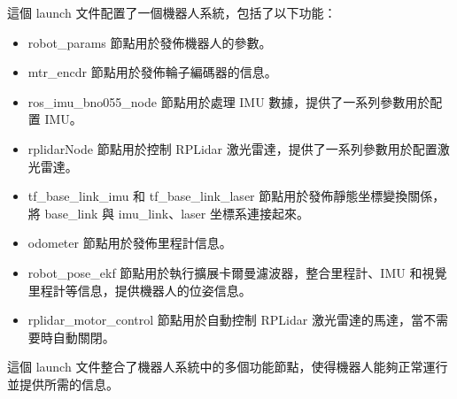 這個 launch 文件配置了一個機器人系統，包括了以下功能：

\begin{itemize}
    \item robot\_params 節點用於發佈機器人的參數。
    \item mtr\_encdr 節點用於發佈輪子編碼器的信息。
    \item ros\_imu\_bno055\_node 節點用於處理 IMU 數據，提供了一系列參數用於配置 IMU。
    \item rplidarNode 節點用於控制 RPLidar 激光雷達，提供了一系列參數用於配置激光雷達。
    \item tf\_base\_link\_imu 和 tf\_base\_link\_laser 節點用於發佈靜態坐標變換關係，將 base\_link 與 imu\_link、laser 坐標系連接起來。
    \item odometer 節點用於發佈里程計信息。
    \item robot\_pose\_ekf 節點用於執行擴展卡爾曼濾波器，整合里程計、IMU 和視覺里程計等信息，提供機器人的位姿信息。
    \item rplidar\_motor\_control 節點用於自動控制 RPLidar 激光雷達的馬達，當不需要時自動關閉。
\end{itemize}

這個 launch 文件整合了機器人系統中的多個功能節點，使得機器人能夠正常運行並提供所需的信息。
